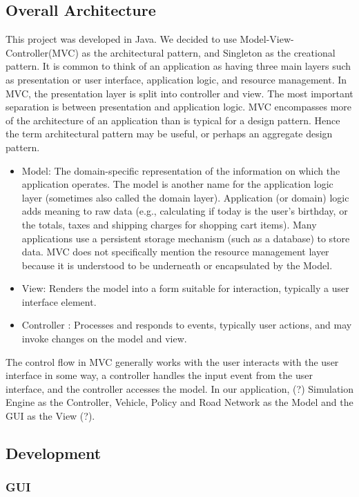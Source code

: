 \documentclass[11pt]{article}
\begin{document}
{\begin{itemize}
\subsection{Overall Architecture}
This project was developed in Java. We decided to use Model-View-Controller(MVC) as the architectural pattern, and Singleton as the creational pattern. It is common to think of an application as having three main
layers such as presentation or user interface, application logic, and resource management. In MVC, the presentation
layer is split into controller and view. The most important separation is between presentation and
application logic. MVC encompasses more of the architecture of an application than is typical for a design pattern. Hence the term architectural pattern may be useful, or perhaps an aggregate design pattern.
    \begin{itemize}
    \item Model: The domain-specific representation of the information on which the application operates.
    The model is another name for the application logic layer (sometimes also called the
    domain layer). Application (or domain) logic adds meaning to raw data (e.g., calculating if today
    is the user’s birthday, or the totals, taxes and shipping charges for shopping cart items).
    Many applications use a persistent storage mechanism (such as a database) to store data.
    MVC does not specifically mention the resource management layer because it is understood
    to be underneath or encapsulated by the Model.
    \item View: Renders the model into a form suitable for interaction, typically a user interface
    element.
    \item Controller : Processes and responds to events, typically user actions, and may invoke changes
    on the model and view.
    \end{itemize}

The control flow in MVC generally works with the user interacts with the user interface in some way, a controller handles the input event from the user interface, and the controller accesses the model. In our application, (?)
Simulation Engine as the Controller, Vehicle, Policy and Road Network as the Model and the GUI as the View (?). 


\subsection{Development}
\subsubsection{GUI}


\end{itemize}}
\end{document}
